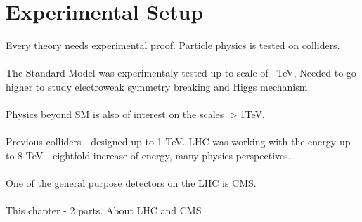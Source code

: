 \chapter{Experimental Setup}
Every theory needs experimental proof. Particle physics is tested on colliders.
\\
\\
The Standard Model was experimentaly tested up to scale of ~TeV, Needed to go higher to 
study electroweak symmetry breaking and Higgs mechanism.
\\
\\
Physics beyond SM is also of interest on the scales $>$1TeV.
\\
\\
Previous colliders - designed up to 1 TeV. LHC \cite{LHCmachine} was working with the energy
up to 8 TeV - eightfold increase of energy, many physics perspectives.
\\
\\
One of the general purpose detectors on the LHC is CMS.
\\
\\
This chapter - 2 parts. About LHC and CMS
\\
\\

